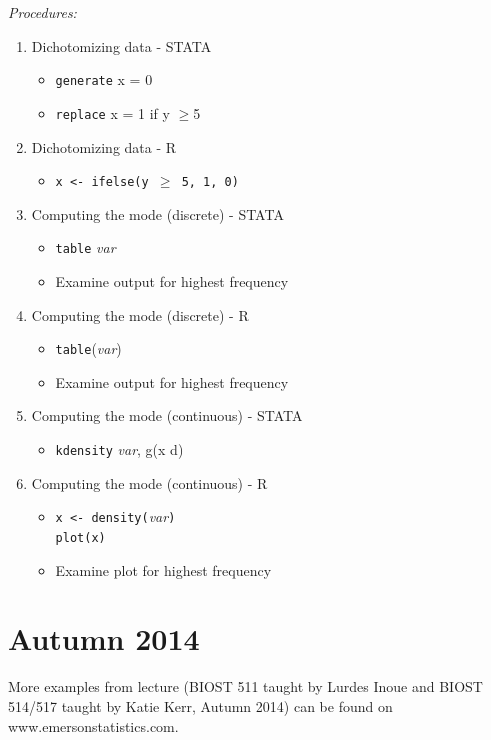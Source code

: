 \documentclass[11pt,letterpaper,fleqn]{report}
\begin{document}
\textit{Procedures:}
\begin{enumerate}[1.]
\item Dichotomizing data - STATA
	\begin{itemize}
		\item \texttt{generate} x = 0
		\item \texttt{replace} x = 1 if y $\geq$5
	\end{itemize}
\item Dichotomizing data - R
	\begin{itemize}
		\item \texttt{x <- ifelse(y $\geq$ 5, 1, 0)}
	\end{itemize}
\item Computing the mode (discrete) - STATA
	\begin{itemize}
		\item \texttt{table} \textit{var}
		\item Examine output for highest frequency
	\end{itemize}
\item Computing the mode (discrete) - R
	\begin{itemize}
		\item \texttt{table}(\textit{var})
		\item Examine output for highest frequency
	\end{itemize}
\item Computing the mode (continuous) - STATA
	\begin{itemize}
		\item \texttt{kdensity} \textit{var}, g(x d)
	\end{itemize}
	\item Computing the mode (continuous) - R
	\begin{itemize}
		\item \texttt{x <- density(}\textit{var}\texttt{)}\\
				\texttt{plot(x)}
		\item Examine plot for highest frequency
	\end{itemize}
\end{enumerate}

\section{Autumn 2014}
More examples from lecture (BIOST 511 taught by Lurdes Inoue and BIOST 514/517 taught by Katie Kerr, Autumn 2014) can be found on www.emersonstatistics.com.
\newpage
\end{document}
